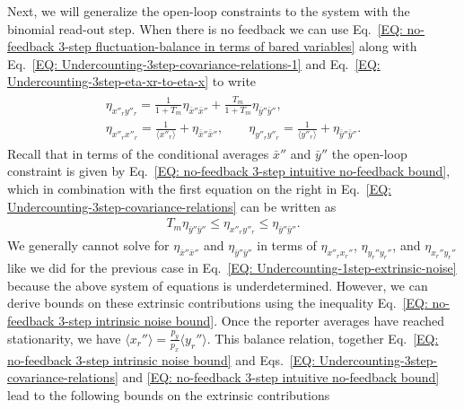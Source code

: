 \documentclass[%
 reprint,prx,
superscriptaddress,
%
%
%
%
%
%
%
%
%
 amsmath,amssymb,
 aps,
%
%
%
%
%
%
]{revtex4-2}
\begin{document}
{{Next, we will generalize the open-loop constraints to the system with the binomial read-out step. When there is no feedback we can use Eq.~\eqref{EQ: no-feedback 3-step fluctuation-balance in terms of bared variables} along with Eq.~\eqref{EQ: Undercounting-3step-covariance-relations-1} and Eq.~\eqref{EQ: Undercounting-3step-eta-xr-to-eta-x} to write 
\begin{align}
\begin{split}
    \eta_{x''_{r}y''_{r}} = \frac{1}{1+T_{m}}\eta_{\bar{x}''\bar{x}''} + \frac{T_{m}}{1+T_{m}}\eta_{\bar{y}''\bar{y}''} , \qquad\\ 
    \eta_{x''_{r}x''_{r}} = \frac{1}{\langle x''_{r} \rangle} + \eta_{\bar{\bar{x}}''\bar{\bar{x}}''},  \qquad 
    \eta_{y''_{r}y''_{r}} = \frac{1}{\langle y''_{r} \rangle} + \eta_{\bar{\bar{y}}''\bar{\bar{y}}''} .
\end{split}
    \label{EQ: Undercounting-3step-covariance-relations}
\end{align}
Recall that in terms of the conditional averages $\bar{x}''$ and $\bar{y}''$ the open-loop constraint is given by Eq.~\eqref{EQ: no-feedback 3-step intuitive no-feedback bound}, which in combination with the first equation on the right in Eq.~\eqref{EQ: Undercounting-3step-covariance-relations} can be written as 
\begin{align}
    T_{m}\eta_{\bar{y}''\bar{y}''} \leq \eta_{x''_{r}y''_{r}} \leq \eta_{\bar{y}''\bar{y}''} .
    \label{EQ: no-feedback 3-step intuitive no-feedback bound-2}
\end{align}
We generally cannot solve for $\eta_{\bar{x}''\bar{x}''}$ and $\eta_{\bar{y}''\bar{y}''}$ in terms of $\eta_{x''_{r}x_{r}''}$, $\eta_{y_{r}''y_{r}''}$, and $\eta_{x_{r}''y_{r}''}$ like we did for the previous case in Eq.~\eqref{EQ: Undercounting-1step-extrinsic-noise} because the above system of equations is underdetermined. However, we can derive bounds on these extrinsic contributions using the inequality Eq.~\eqref{EQ: no-feedback 3-step intrinsic noise bound}. Once the reporter averages have reached stationarity, we have $\langle x_{r}'' \rangle = \frac{p_{y}}{p_{x}}\langle y_{r}'' \rangle$. This balance relation, together Eq.~\eqref{EQ: no-feedback 3-step intrinsic noise bound} and Eqs.~\eqref{EQ: Undercounting-3step-covariance-relations} and \eqref{EQ: no-feedback 3-step intuitive no-feedback bound} lead to the following bounds on the extrinsic contributions
\begin{widetext}
\begin{align}
    \begin{split}

\end{split}
\end{align}
\end{widetext}}}
\end{document}

